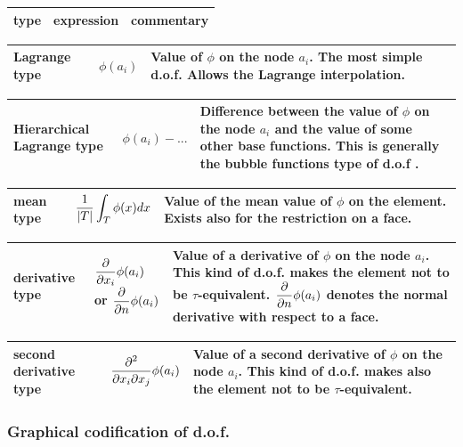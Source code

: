 \documentclass[11pt,a4paper]{article}
\begin{document}
\begin{center}
\begin{tabular}{|m{3cm}|m{3cm}|m{8cm}|} \hline 
type & expression  & commentary \\ \hline
\end{tabular}
\begin{tabular}{|m{3cm}|m{3cm}|m{8cm}|} \hline
Lagrange type & $\phi(a_i)$ & Value of $\phi$ on the node $a_i$. The most simple d.o.f. Allows the Lagrange interpolation. \\ \hline
\end{tabular}
\begin{tabular}{|m{3cm}|m{3cm}|m{8cm}|} \hline
Hierarchical Lagrange type & $\phi(a_i) - ...$ & Difference between the value of $\phi$ on the node $a_i$ and the value of some other base functions. This is generally the bubble functions type of d.o.f . \\ \hline
\end{tabular}
\begin{tabular}{|m{3cm}|m{3cm}|m{8cm}|} \hline
mean type & ${\displaystyle \frac{\displaystyle 1}{\displaystyle |T|}}\displaystyle \int_T \phi(x) dx$ & Value of the mean value of $\phi$ on the element. Exists also for the restriction on a face.\\ \hline
\end{tabular}
\begin{tabular}{|m{3cm}|m{3cm}|m{8cm}|} \hline
derivative type & ${\displaystyle \frac{\displaystyle \partial}{\displaystyle \partial x_i}}\phi(a_i)$ or ${\displaystyle \frac{\displaystyle \partial}{\displaystyle \partial n}}\phi(a_i)$ & Value of a derivative of $\phi$ on the node $a_i$. This kind of d.o.f. makes the element not to be $\tau$-equivalent. ${\displaystyle \frac{\displaystyle \partial}{\displaystyle \partial n}}\phi(a_i)$ denotes the normal derivative with respect to a face.\\ \hline
\end{tabular}
\begin{tabular}{|m{3cm}|m{3cm}|m{8cm}|} \hline
second derivative type & ${\displaystyle \frac{\displaystyle \partial^2}{\displaystyle \partial x_i\partial x_j}}\phi(a_i)$  & Value of a second derivative of $\phi$ on the node $a_i$. This kind of d.o.f. makes also the element not to be $\tau$-equivalent.\\ \hline
\end{tabular}

\end{center}

\subsubsection{Graphical codification of d.o.f.}
\end{document}
